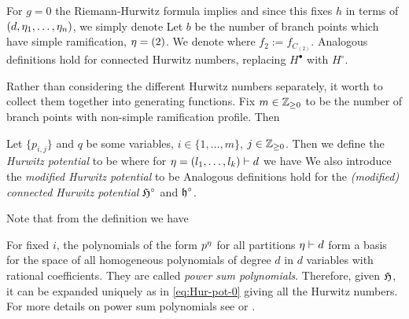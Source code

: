 \documentclass[../main/main.tex]{subfiles}
\begin{document}
For $g=0$ the Riemann-Hurwitz formula implies
and since this fixes $h$ in terms of $(d,\eta_1,\ldots,\eta_n)$, we simply denote
Let $b$ be the number of branch points which have simple ramification, \ie $\eta=(2)$. We denote
where $f_2:=f_{C_{(2)}}$. Analogous definitions hold for connected Hurwitz numbers, replacing $H^\bullet$ with $H^\circ$. 

Rather than considering the different Hurwitz numbers separately, it worth to collect them together into generating functions. Fix $m\in\mathbb Z_{\geq0}$ to be the number of branch points with non-simple ramification profile. Then

\begin{definition}
	Let $\{p_{i,j}\}$ and $q$ be some variables, $i\in\{1,\ldots,m\}$, $j\in\mathbb Z_{\geq0}$. Then we define the \emph{Hurwitz potential} to be
	where for $\eta=(l_1,\ldots,l_k)\vdash d$ we have
	We also introduce the \emph{modified Hurwitz potential} to be
	Analogous definitions hold for the \emph{(modified) connected Hurwitz potential} $\mathfrak H^\circ$ and $\mathfrak h^\circ$. 
\end{definition}

Note that from the definition we have

For fixed $i$, the polynomials of the form $p^\eta$ for all partitions $\eta\vdash d$ form a basis for the space of all homogeneous polynomials of degree $d$ in $d$ variables with rational coefficients. They are called \emph{power sum polynomials}. Therefore, given $\mathfrak H$, it can be expanded uniquely as in \eqref{eq:Hur-pot-0} giving all the Hurwitz numbers. For more details on power sum polynomials see \cite[§A]{FH} or \cite[Part I]{M}. 
\end{document}
